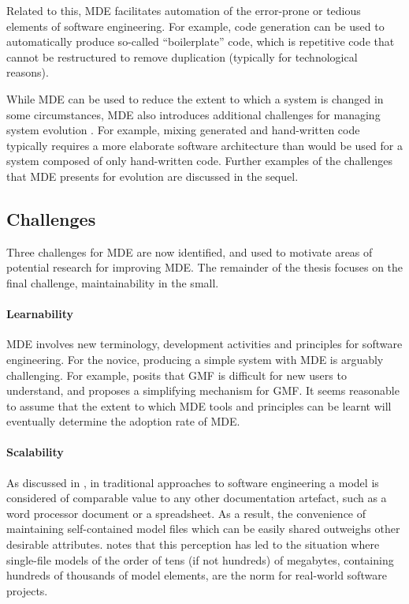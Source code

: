 Related to this, MDE facilitates automation of the error-prone or tedious elements of software engineering. For example, code generation can be used to automatically produce so-called ``boilerplate'' code, which is repetitive code that cannot be restructured to remove duplication (typically for technological reasons).

While MDE can be used to reduce the extent to which a system is changed in some circumstances, MDE also introduces additional challenges for managing system evolution \cite{Mens07}. For example, mixing generated and hand-written code typically requires a more elaborate software architecture than would be used for a system composed of only hand-written code. Further examples of the challenges that MDE presents for evolution are discussed in the sequel.

\subsection{Challenges}
\label{subsec:mde_challenges}
Three challenges for MDE are now identified, and used to motivate areas of potential research for improving MDE. The remainder of the thesis focuses on the final challenge, maintainability in the small.

\paragraph{Learnability} MDE involves new terminology, development activities and principles for software engineering. For the novice, producing a simple system with MDE is arguably challenging. For example, \cite{kolovos10eugenia} posits that GMF is difficult for new users to understand, and proposes a simplifying mechanism for GMF. It seems reasonable to assume that the extent to which MDE tools and principles can be learnt will eventually determine the adoption rate of MDE.

\paragraph{Scalability} As discussed in \cite{rose10concordance}, in traditional approaches to software engineering a model is considered of comparable value to any other documentation artefact, such as a word processor document or a spreadsheet. As a result, the convenience of maintaining self-contained model files which can be easily shared outweighs other desirable attributes. \cite{kolovos08scalability} notes that this perception has led to the situation where single-file models of the order of tens (if not hundreds) of megabytes, containing hundreds of thousands of model elements, are the norm for real-world software projects.

